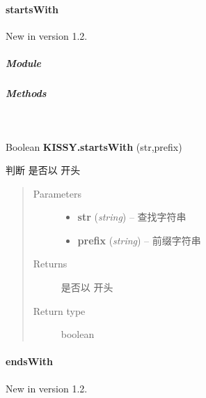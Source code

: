 \documentclass[letterpaper,10pt,english]{sphinxmanual}
\begin{document}
\paragraph{startsWith}
\label{api/seed/lang/startsWith:startswith}\label{api/seed/lang/startsWith::doc}New in version 1.2.

\subparagraph{Module}
\label{api/seed/lang/startsWith:module}\begin{quote}

{\hyperref[api/seed/lang/index:module-Lang]{}}
\end{quote}


\subparagraph{Methods}
\label{api/seed/lang/startsWith:methods}

\begin{fulllineitems}
\label{api/seed/lang/startsWith:Lang.KISSY.startsWith}~
\begin{DUlineblock}{0em}
\item[] Boolean \textbf{KISSY.startsWith} (str,prefix)
\item[] 判断  是否以  开头
\end{DUlineblock}
\begin{quote}\begin{description}
\item[{Parameters}] \leavevmode\begin{itemize}
\item {}
\textbf{str} (\emph{string}) -- 查找字符串

\item {}
\textbf{prefix} (\emph{string}) -- 前缀字符串

\end{itemize}

\item[{Returns}] \leavevmode
{} 是否以  开头

\item[{Return type}] \leavevmode
boolean

\end{description}\end{quote}

\end{fulllineitems}



\paragraph{endsWith}
\label{api/seed/lang/endsWith:endswith}\label{api/seed/lang/endsWith::doc}New in version 1.2.
\end{document}
